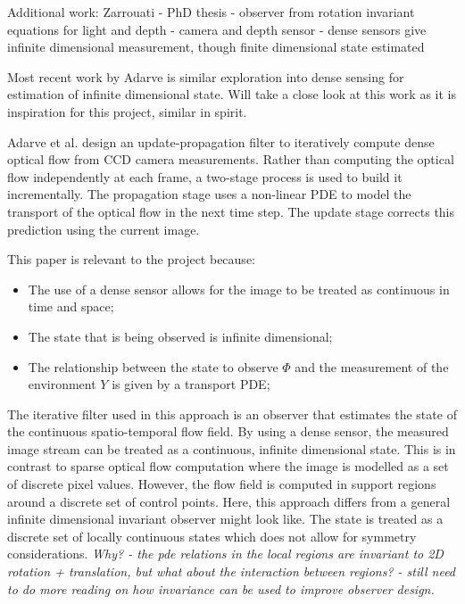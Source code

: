 Additional work:
Zarrouati \cite{zarrouati2013augmented} - PhD thesis - observer from rotation invariant equations for light and depth - camera and depth sensor - dense sensors give infinite dimensional measurement, though finite dimensional state estimated

Most recent work by Adarve \cite{adarvefiltering} is similar exploration into dense sensing for estimation of infinite dimensional state. Will take a close look at this work as it is inspiration for this project, similar in spirit.

Adarve et al. design an update-propagation filter to iteratively compute dense optical flow from CCD camera measurements. Rather than computing the optical flow independently at each frame, a two-stage process is used to build it incrementally. The propagation stage uses a non-linear PDE to model the transport of the optical flow in the next time step. The update stage corrects this prediction using the current image.

This paper is relevant to the project because:
\begin{itemize}
\item The use of a dense sensor allows for the image to be treated as continuous in time and space;
\item The state that is being observed is infinite dimensional;
\item The relationship between the state to observe $ \Phi $ and the measurement of the environment $ Y $ is given by a transport PDE;
\end{itemize}

The iterative filter used in this approach is an observer that estimates the state of the continuous spatio-temporal flow field. By using a dense sensor, the measured image stream can be treated as a continuous, infinite dimensional state. This is in contrast to sparse optical flow computation where the image is modelled as a set of discrete pixel values. However, the flow field is computed in support regions around a discrete set of control points. Here, this approach differs from a general infinite dimensional invariant observer might look like. The state is treated as a discrete set of locally continuous states which does not allow for symmetry considerations. \textit{Why? - the pde relations in the local regions are invariant to 2D rotation + translation, but what about the interaction between regions? - still need to do more reading on how invariance can be used to improve observer design.}

